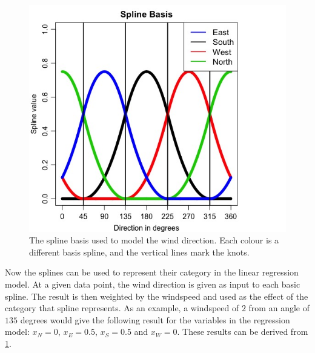 \begin{figure}
    \centering
    \includegraphics[width=.8\textwidth]{../../../figures/SplineBasis.jpeg}
    \caption{The spline basis used to model the wind direction. Each colour is a different basis spline, and the vertical lines mark the knots.}
    \label{fig:spline_basis}
\end{figure}

\noindent Now the splines can be used to represent their category in the linear regression model. At a given data point, the wind direction is given as input to each basic spline. The result is then weighted by the windspeed and used as the effect of the category that spline represents. As an example, a windspeed of $2$ from an angle of $135$ degrees would give the following result for the variables in the regression model: $x_N=0$, $x_E=0.5$, $x_S=0.5$ and $x_W=0$. These results can be derived from \cref{fig:spline_basis}.

